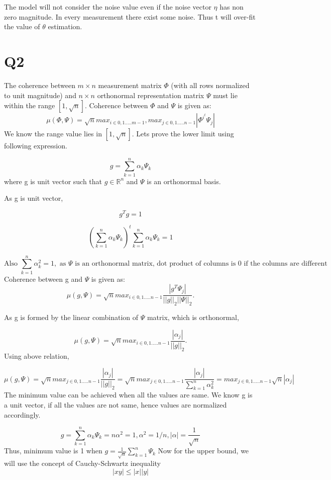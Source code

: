 \documentclass{article}
\begin{document}
The model will not consider the noise value even if the noise vector $\eta$ has non zero magnitude. In every measurement there exist some noise. Thus t will over-fit the value of $\theta$ estimation.
\section{Q2}
The coherence between $m \times n$ measurement matrix $\Phi$ (with all rows normalized to unit magnitude) and $n \times n$ orthonormal representation matrix $\Psi$ must lie within the range $ [1, \sqrt{n}]$.
Coherence between $\Phi$ and $\Psi$ is given as:
$$
    \mu(\Phi, \Psi) = \sqrt{n} max_{i \in {0,1 ..... m-1}},max_{j \in {0,1 ..... n-1}} | \Phi^{i^t} \Psi_j|
$$
We know the range value lies in $[1, \sqrt{n}]$.
Lets prove the lower limit using following expression.

\textbf{$$
g = \sum^{n}_{k=1} \alpha_k \Psi_k
$$} where g is unit vector such that $g \in \mathbb{R}^n$ and $\Psi$ is an orthonormal basis.

As g is unit vector,

$$
    g^Tg = 1
$$

$$
     (\sum^{n}_{k=1} \alpha_k \Psi_k)^t  \sum^{n}_{k=1} \alpha_k \Psi_k = 1
$$

$$
     \text{Also }\sum^{n}_{k=1} \alpha_k^2=1 ,  \text{   as } \Psi \text{ is an orthonormal matrix, dot product of columns is 0 if the columns are different}
$$
Coherence between g and $\Psi$ is given as:
$$
    \mu(g, \Psi) = \sqrt{n} max_{i \in {0,1 ..... n-1}} \frac{| g^T \Psi_j|}{||g||_2 ||\Psi||_2}.
$$

As g is formed by the linear combination of $\Psi$ matrix, which is orthonormal,

$$
    \mu(g, \Psi) = \sqrt{n} max_{i \in {0,1 ..... n-1}} \frac{|\alpha_j|}{||g||_2}.
$$
Using above relation,

$$
    \mu(g, \Psi) = \sqrt{n} max_{j \in {0,1 ..... n-1}} \frac{|\alpha_j|}{||g||_2} = \sqrt{n} max_{j \in {0,1 ..... n-1}} \frac{|\alpha_j|}{\sum_{k=1}^n \alpha_k^2}  =  max_{j \in {0,1..... n-1}}   \sqrt{n} |\alpha_j |
$$
The minimum value can be achieved when all the values are same. We know g is a unit vector, if all the values are not same, hence values are normalized accordingly.

$$
g = \sum^{n}_{k=1} \alpha_k \Psi_k = n\alpha^2 = 1, \alpha ^2 = 1/n , |\alpha| = \frac{1}{\sqrt{n}}
$$
Thus, minimum value is 1 when $g = \frac{1}{\sqrt{n}}\sum^{n}_{k=1} \Psi_k$
\newline
\newline
Now for the upper bound, we will use the concept of Cauchy-Schwartz inequality
$$|xy| \le |x||y|$$
\end{document}
